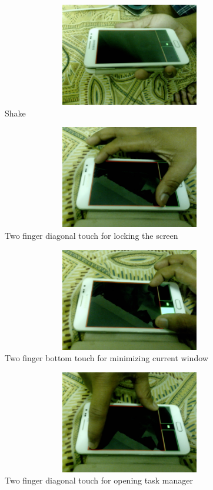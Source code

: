 \documentclass[10pt,conference,letterpaper]{IEEEtran}
\begin{document}
\begin{figure}
\centering
\includegraphics[width=120mm,height=45mm]{2.eps}
\caption{Shake}
\end{figure}
\begin{figure}
\centering
\includegraphics[width=120mm,height=45mm]{3.eps}
\caption{Two finger diagonal touch for locking the screen}
\end{figure}
\begin{figure}
\centering
\includegraphics[width=120mm,height=45mm]{4.eps}
\caption{Two finger bottom touch for minimizing current window}
\end{figure}
\begin{figure}
\centering
\includegraphics[width=120mm,height=45mm]{5.eps}
\caption{Two finger diagonal touch for opening task manager}
\end{figure}
\end{document}
